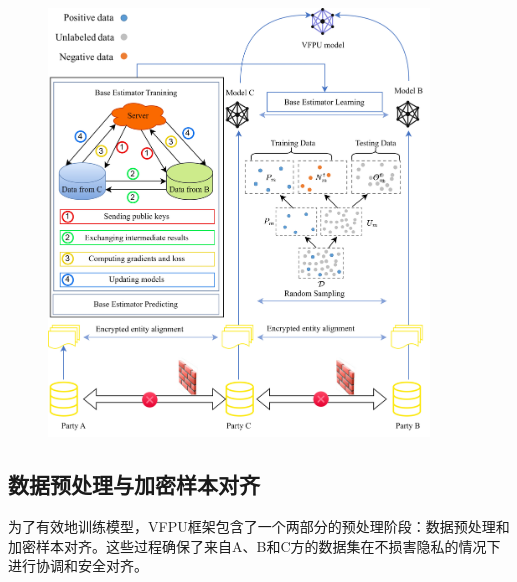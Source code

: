 \begin{figure}[h]  %
	\centering     %
	\includegraphics[width=0.9\textwidth]{chapters/imgs/Figure 1 in JEPG format}  
	
	
	\label{fig:VFPU}  %
\end{figure}



\subsection{数据预处理与加密样本对齐}
为了有效地训练模型，VFPU框架包含了一个两部分的预处理阶段：数据预处理和加密样本对齐。这些过程确保了来自A、B和C方的数据集在不损害隐私的情况下进行协调和安全对齐。 

